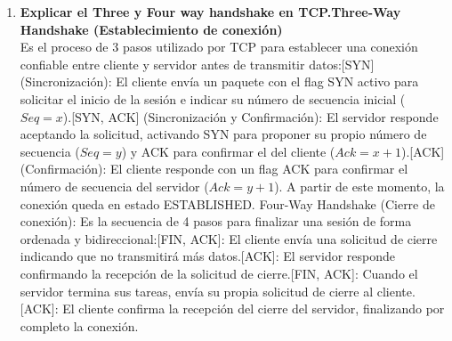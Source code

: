 \documentclass[11pt,a4paper]{article}
\begin{document}
\begin{enumerate}
\begin{enumerate}
\begin{itemize}
    \item \textbf{Opciones (variable):} permite incluir información adicional. Un ejemplo es la opción que especifica la longitud máxima de segmento que será aceptada.
\end{itemize}
      \item \textbf{Explicar el Three y Four way handshake en TCP.Three-Way Handshake (Establecimiento de conexión)} \\
Es el proceso de 3 pasos utilizado por TCP para establecer una conexión confiable entre cliente y servidor antes de transmitir datos:[SYN] (Sincronización): El cliente envía un paquete con el flag SYN activo para solicitar el inicio de la sesión e indicar su número de secuencia inicial ($Seq = x$).[SYN, ACK] (Sincronización y Confirmación): El servidor responde aceptando la solicitud, activando SYN para proponer su propio número de secuencia ($Seq = y$) y ACK para confirmar el del cliente ($Ack = x + 1$).[ACK] (Confirmación): El cliente responde con un flag ACK para confirmar el número de secuencia del servidor ($Ack = y + 1$). A partir de este momento, la conexión queda en estado ESTABLISHED. Four-Way Handshake (Cierre de conexión): Es la secuencia de 4 pasos para finalizar una sesión de forma ordenada y bidireccional:[FIN, ACK]: El cliente envía una solicitud de cierre indicando que no transmitirá más datos.[ACK]: El servidor responde confirmando la recepción de la solicitud de cierre.[FIN, ACK]: Cuando el servidor termina sus tareas, envía su propia solicitud de cierre al cliente.[ACK]: El cliente confirma la recepción del cierre del servidor, finalizando por completo la conexión.


\end{enumerate}
\end{enumerate}
\end{document}
